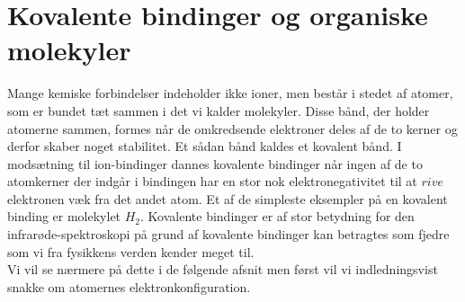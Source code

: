 \chapter{Kovalente bindinger og organiske molekyler}
Mange kemiske forbindelser indeholder ikke ioner, men består i stedet af atomer, som er bundet tæt sammen i det vi kalder molekyler. Disse bånd, der holder atomerne sammen, formes når de omkredsende elektroner deles af de to kerner og derfor skaber noget stabilitet. Et sådan bånd kaldes et kovalent bånd. I modsætning til ion-bindinger dannes kovalente bindinger når ingen af de to atomkerner der indgår i bindingen har en stor nok elektronegativitet til at $rive$ elektronen væk fra det andet atom. Et af de simpleste eksempler på en kovalent binding er molekylet $H_2$. Kovalente bindinger er af stor betydning for den infrarøde-spektroskopi på grund af kovalente bindinger kan betragtes som fjedre som vi fra fysikkens verden kender meget til.
\\

Vi vil se nærmere på dette i de følgende afsnit men først vil vi indledningsvist snakke om atomernes elektronkonfiguration. 

